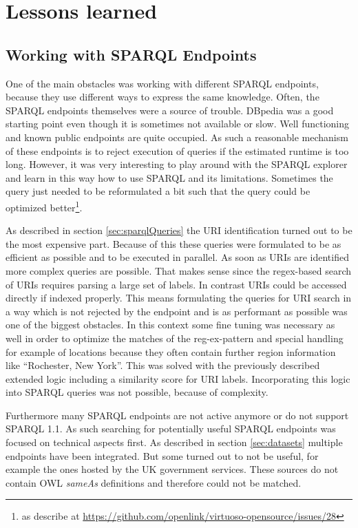\section{Lessons learned}
\subsection{Working with SPARQL Endpoints}
One of the main obstacles was working with different SPARQL endpoints, because they use different ways to express the same knowledge. Often, the SPARQL endpoints themselves were a source of trouble. DBpedia was a good starting point even though it is sometimes not available or slow. Well functioning and known public endpoints are quite occupied. As such a reasonable mechanism of these endpoints is to reject execution of queries if the estimated runtime is too long. However, it was very interesting to play around with the SPARQL explorer and learn in this way how to use SPARQL and its limitations. Sometimes the query just needed to be reformulated a bit such that the query could be optimized better\footnote{as describe at \url{https://github.com/openlink/virtuoso-opensource/issues/28}}.

As described in section \ref{sec:sparqlQueries} the URI identification turned out to be the most expensive part. Because of this  these queries were formulated to be as efficient as possible and to be executed in parallel. As soon as URIs are identified more complex queries are possible. That makes sense since the regex-based search of URIs requires parsing a large set of labels. In contrast URIs could be accessed directly if indexed properly. This means formulating the queries for URI search in a way which is not rejected by the endpoint and is as performant as possible was one of the biggest obstacles. In this context some fine tuning was necessary as well in order to optimize the matches of the reg-ex-pattern and special handling for example of locations because they often contain further region information like ``Rochester, New York''. This was solved with the previously described extended logic including a similarity score for URI labels. Incorporating this logic into SPARQL queries was not possible, because of complexity. 

Furthermore many SPARQL endpoints are not active anymore or do not support SPARQL 1.1. As such searching for potentially useful SPARQL endpoints was focused on technical aspects first. As described in section \ref{sec:datasets} multiple endpoints have been integrated. But some turned out to not be useful, for example the ones hosted by the UK government services. These sources do not contain OWL \textit{sameAs} definitions and therefore could not be matched.

